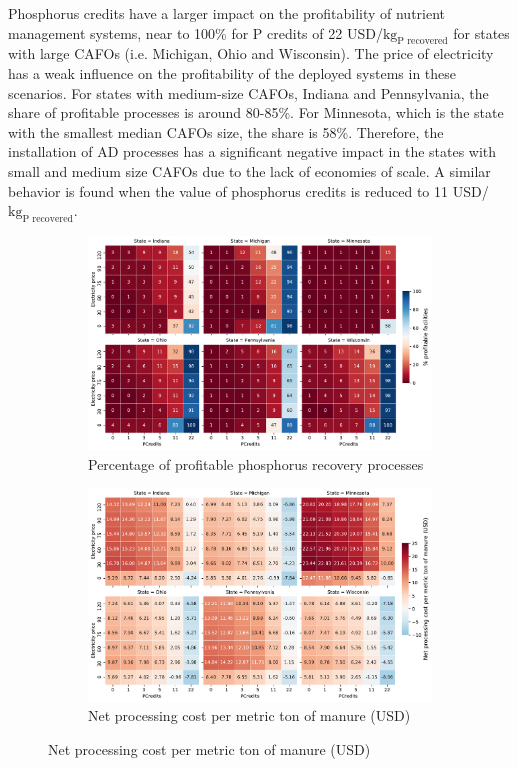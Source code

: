 \begin{refsection}[referencesCh5]
Phosphorus credits have a larger impact on the profitability of nutrient management systems, near to 100\% for P credits of 22 USD/${\text{kg}_\text{P recovered}}$ for states with large CAFOs (i.e. Michigan, Ohio and Wisconsin). The price of electricity has a weak influence on the profitability of the deployed systems in these scenarios. For states with medium-size CAFOs, Indiana and Pennsylvania, the share of profitable processes is around 80-85\%. For Minnesota, which is the state with the smallest median CAFOs size, the share is 58\%. Therefore, the installation of AD processes has a significant negative impact in the states with small and medium size CAFOs due to the lack of economies of scale. A similar behavior is found when the value of phosphorus credits is reduced to 11 USD/${\text{kg}_\text{P recovered}}$.

\begin{figure}[h!]
	\centering
	\begin{subfigure}[t]{\textwidth}
		\centering
		\includegraphics[width=\linewidth]{gfx/Chapter5/DataAnalysisProfitableClean.pdf} 
		\caption{Percentage of profitable phosphorus recovery processes}
		\label{fig:PercProfitableStates_AllScenarios}
	\end{subfigure}
	\par\bigskip
	\begin{subfigure}[t]{\textwidth}
		\centering
		\includegraphics[width=\linewidth]{gfx/Chapter5/TAC_tonManureClean.pdf}
		\caption{Net processing cost per metric ton of manure (USD)}
		\label{fig:TAC_kgManure_AllScenarios}
	\end{subfigure}
	

\end{figure}
\end{refsection}

